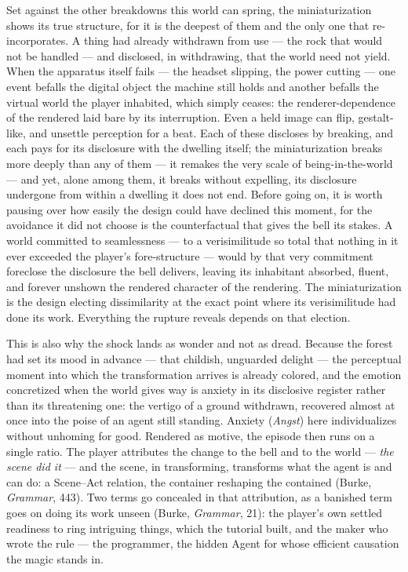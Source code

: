 Set against the other breakdowns this world can spring, the miniaturization shows its true structure, for it is the deepest of them and the only one that re-incorporates. A thing had already withdrawn from use — the rock that would not be handled — and disclosed, in withdrawing, that the world need not yield. When the apparatus itself fails — the headset slipping, the power cutting — one event befalls the digital object the machine still holds and another befalls the virtual world the player inhabited, which simply ceases: the renderer-dependence of the rendered laid bare by its interruption. Even a held image can flip, gestalt-like, and unsettle perception for a beat. Each of these discloses by breaking, and each pays for its disclosure with the dwelling itself; the miniaturization breaks more deeply than any of them — it remakes the very scale of being-in-the-world — and yet, alone among them, it breaks without expelling, its disclosure undergone from within a dwelling it does not end. Before going on, it is worth pausing over how easily the design could have declined this moment, for the avoidance it did not choose is the counterfactual that gives the bell its stakes. A world committed to seamlessness — to a verisimilitude so total that nothing in it ever exceeded the player's fore-structure — would by that very commitment foreclose the disclosure the bell delivers, leaving its inhabitant absorbed, fluent, and forever unshown the rendered character of the rendering. The miniaturization is the design electing dissimilarity at the exact point where its verisimilitude had done its work. Everything the rupture reveals depends on that election.

This is also why the shock lands as wonder and not as dread. Because the forest had set its mood in advance — that childish, unguarded delight — the perceptual moment into which the transformation arrives is already colored, and the emotion concretized when the world gives way is anxiety in its disclosive register rather than its threatening one: the vertigo of a ground withdrawn, recovered almost at once into the poise of an agent still standing. Anxiety (\textit{Angst}) here individualizes without unhoming for good. Rendered as motive, the episode then runs on a single ratio. The player attributes the change to the bell and to the world — \textit{the scene did it} — and the scene, in transforming, transforms what the agent is and can do: a Scene--Act relation, the container reshaping the contained (Burke, \textit{Grammar}, 443). Two terms go concealed in that attribution, as a banished term goes on doing its work unseen (Burke, \textit{Grammar}, 21): the player's own settled readiness to ring intriguing things, which the tutorial built, and the maker who wrote the rule — the programmer, the hidden Agent for whose efficient causation the magic stands in.

